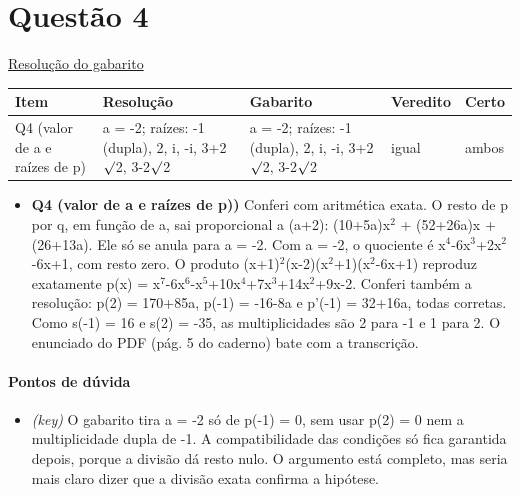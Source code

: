 \documentclass{article}%
\begin{document}
\section*{Questão 4}%
\href{https://poliedroresolve.sistemapoliedro.com.br/vestibulares/ita/2027/ita-2-fase-dia-1-20-10-2026-2-fase-dia-1/dissertativa-4-matematica-2-fase-dia-1-ita-2027}{Resolução do gabarito}\par\smallskip%
\begin{longtable}{@{}p{} p{} p{} p{} p{}@{}}\toprule Item & Resolução & Gabarito & Veredito & Certo \\ \midrule
Q4 (valor de a e raízes de p) & a = {-}2; raízes: {-}1 (dupla), 2, i, {-}i, 3+2$\surd$2, 3{-}2$\surd$2 & a = {-}2; raízes: {-}1 (dupla), 2, i, {-}i, 3+2$\surd$2, 3{-}2$\surd$2 & igual & ambos \\
\bottomrule\end{longtable}%
\begin{itemize}%
\item%
\textbf{Q4 (valor de a e raízes de p))} Conferi com aritmética exata. O resto de p por q, em função de a, sai proporcional a (a+2): (10+5a)x$^2$ + (52+26a)x + (26+13a). Ele só se anula para a = {-}2. Com a = {-}2, o quociente é x$^{4}${-}6x$^3$+2x$^2${-}6x+1, com resto zero. O produto (x+1)$^2$(x{-}2)(x$^2$+1)(x$^2${-}6x+1) reproduz exatamente p(x) = x$^{7}${-}6x$^{6}${-}x$^{5}$+10x$^{4}$+7x$^3$+14x$^2$+9x{-}2. Conferi também a resolução: p(2) = 170+85a, p({-}1) = {-}16{-}8a e p'({-}1) = 32+16a, todas corretas. Como s({-}1) = 16 e s(2) = {-}35, as multiplicidades são 2 para {-}1 e 1 para 2. O enunciado do PDF (pág. 5 do caderno) bate com a transcrição.%
\end{itemize}%
\paragraph{Pontos de dúvida}%
\begin{itemize}%
\item%
\textit{(key)} O gabarito tira a = {-}2 só de p({-}1) = 0, sem usar p(2) = 0 nem a multiplicidade dupla de {-}1. A compatibilidade das condições só fica garantida depois, porque a divisão dá resto nulo. O argumento está completo, mas seria mais claro dizer que a divisão exata confirma a hipótese.%
\end{itemize}%
\end{document}
